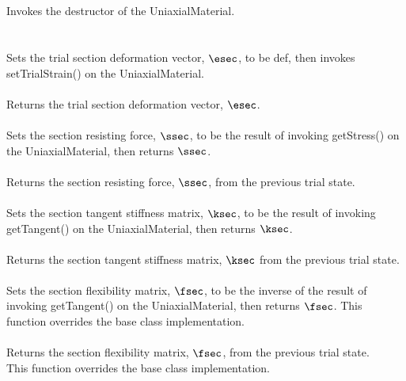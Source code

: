  \\
\\ 
Invokes the destructor of the UniaxialMaterial. \\

 \\
  \\
Sets the trial section deformation vector, $\esec$, to be \p def, then invokes
setTrialStrain() on the UniaxialMaterial. \\

 \\
Returns the trial section deformation vector, $\esec$. \\

 \\
Sets the section resisting force, $\ssec$, to be the result of invoking 
getStress() on the UniaxialMaterial, then returns $\ssec$. \\

 \\
Returns the section resisting force, $\ssec$, from the previous trial state. \\

 \\
Sets the section tangent stiffness matrix, $\ksec$, to be the result of
invoking getTangent() on the UniaxialMaterial, then returns $\ksec$. \\

 \\
Returns the section tangent stiffness matrix, $\ksec$ from the previous trial state. \\

 \\
Sets the section flexibility matrix, $\fsec$, to be the inverse of the result
of invoking getTangent() on the UniaxialMaterial, then returns $\fsec$.
This function overrides the base class implementation. \\

 \\
Returns the section flexibility matrix, $\fsec$, from the previous trial state. \\
This function overrides the base class implementation. \\

